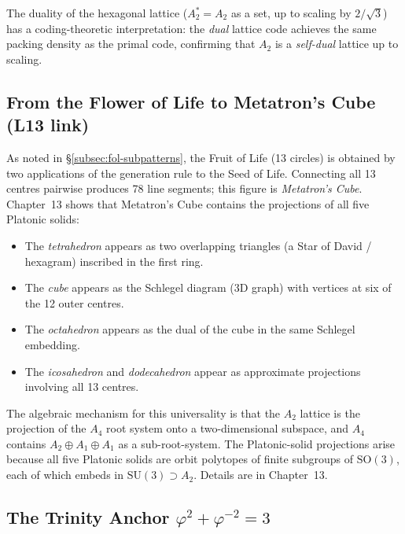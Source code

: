 The duality of the hexagonal lattice (\(A_2^*=A_2\) as a set, up to
scaling by \(2/\sqrt{3}\)) has a coding-theoretic interpretation:
the \emph{dual} lattice code achieves the same packing density as the
primal code, confirming that \(A_2\) is a \emph{self-dual} lattice
up to scaling.

\subsection{From the Flower of Life to Metatron's Cube (L13 link)}
\label{subsec:fol-metatron}

As noted in §\ref{subsec:fol-subpatterns}, the Fruit of Life (13 circles)
is obtained by two applications of the generation rule to the Seed of Life.
Connecting all 13 centres pairwise produces 78 line segments; this figure
is \emph{Metatron's Cube}.  Chapter~13 shows that Metatron's Cube contains
the projections of all five Platonic solids:
\begin{itemize}
  \item The \emph{tetrahedron} appears as two overlapping triangles
        (a Star of David / hexagram) inscribed in the first ring.
  \item The \emph{cube} appears as the Schlegel diagram (3D graph)
        with vertices at six of the 12 outer centres.
  \item The \emph{octahedron} appears as the dual of the cube in the
        same Schlegel embedding.
  \item The \emph{icosahedron} and \emph{dodecahedron} appear as
        approximate projections involving all 13 centres.
\end{itemize}
The algebraic mechanism for this universality is that the \(A_2\) lattice
is the projection of the \(A_4\) root system onto a two-dimensional
subspace, and \(A_4\) contains \(A_2\oplus A_1\oplus A_1\) as a
sub-root-system.  The Platonic-solid projections arise because all five
Platonic solids are orbit polytopes of finite subgroups of
\(\mathrm{SO}(3)\), each of which embeds in \(\mathrm{SU}(3)\supset A_2\).
Details are in Chapter~13.

\subsection{The Trinity Anchor \(\varphi^2+\varphi^{-2}=3\)}
\label{subsec:fol-trinity-anchor}

